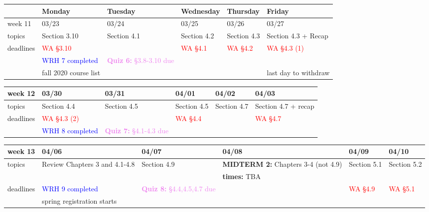 \documentclass[11pt]{article}
\begin{document}
  
\begin{center}
\begin{tabularx}{\textwidth}{|p{1.5cm}|| L | L | L | L | L |}
\hline
&Monday & Tuesday & Wednesday & Thursday & Friday \\
\hline 
week 11&03/23&03/24&03/25&03/26&03/27\\ \hline
topics&Section 3.10&Section 4.1&Section 4.2&Section 4.3&Section 4.3 + Recap\\ 
\hline
deadlines&\textcolor{red}{WA \S 3.10}&&\textcolor{red}{WA \S 4.1}&\textcolor{red}{ WA \S 4.2}& \textcolor{red}{WA \S 4.3 (1)}\\
&\textcolor{blue}{WRH 7 completed}&\textcolor{violet}{\textbf{Quiz 6:} \S3.8-3.10 due }&&&\\
&\textcolor{ddgreen}{fall 2020 course list}&&&&\textcolor{ddgreen}{last day to withdraw} \\
\hline
\end{tabularx} \end{center}

\begin{center}
\begin{tabularx}{\textwidth}{|p{1.5cm}|| L | L | L | L | L |}
\hline
{}
week 12&03/30&03/31&04/01&04/02&04/03\\ \hline
topics&Section 4.4&Section 4.5&Section 4.5&Section 4.7&Section 4.7 + recap\\ 
\hline
deadlines& \textcolor{red}{WA \S 4.3 (2)}&&\textcolor{red}{WA \S 4.4}&&\textcolor{red}{WA \S 4.7}\\
&\textcolor{blue}{WRH 8 completed}& \textcolor{violet}{\textbf{Quiz 7:} \S4.1-4.3 due }&&&\\ \hline
\end{tabularx} \end{center}

\begin{center}
\begin{tabularx}{\textwidth}{|p{1.5cm}|| L | L | L | L | L |}
\hline
week 13&04/06&04/07&04/08&04/09&04/10\\ \hline
topics &Review Chapters 3 and 4.1-4.8&Section 4.9&\textcolor{dcyan}{\textbf{MIDTERM 2: }} Chapters 3-4 (not 4.9)&Section 5.1&Section 5.2\\ 
&&&\textcolor{dcyan}{\textbf{times:} TBA}&&\\ \hline

deadlines&\textcolor{blue}{WRH 9 completed} & \textcolor{violet}{\textbf{Quiz 8:} \S4.4,4.5,4.7 due }&&\textcolor{red}{WA \S 4.9}&\textcolor{red}{WA \S 5.1}\\
&\textcolor{ddgreen}{spring registration starts} &&&& \\ \hline \end{tabularx} \end{center}
\end{document}
